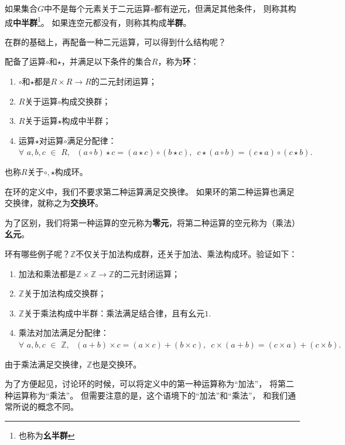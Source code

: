 \documentclass[12pt,UTF8,fontset=none]{ctexbook}
\begin{document}
\begin{appendix}
如果集合$G$中不是每个元素关于二元运算$\circ$都有逆元，但满足其他条件，
则称其构成\textbf{中半群}\footnote{也称为\textbf{幺半群}}。
如果连空元都没有，则称其构成\textbf{半群}。

在群的基础上，再配备一种二元运算，可以得到什么结构呢？

\begin{df}\label{df:0_2}
    配备了运算$\circ$和$\star$，并满足以下条件的集合$R$，称为\textbf{环}：

    \begin{enumerate}
        \item $\circ$和$\star$都是$R \times R \rightarrow R$的二元封闭运算；
        \item $R$关于运算$\circ$构成交换群；
        \item $R$关于运算$\star$构成中半群；
        \item 运算$\star$对运算$\circ$满足分配律：$\forall \,\, a, b, c \,\, \in \,\, R, \,\,\,\, (a \circ b) \star c = (a \star c) \circ (b \star c), \,\,\, c\star (a \circ b) = (c \star a) \circ (c \star b).$
    \end{enumerate}
    也称$R$关于$\circ, \star$构成环。
\end{df}

在环的定义中，我们不要求第二种运算满足交换律。
如果环的第二种运算也满足交换律，就称之为\textbf{交换环}。

为了区别，我们将第一种运算的空元称为\textbf{零元}，将第二种运算的空元称为（乘法）\textbf{幺元}。

环有哪些例子呢？$\mathbb{Z}$不仅关于加法构成群，还关于加法、乘法构成环。验证如下：

\begin{enumerate}
    \item 加法和乘法都是$\mathbb{Z} \times \mathbb{Z} \rightarrow \mathbb{Z}$的二元封闭运算；
    \item $\mathbb{Z}$关于加法构成交换群；
    \item $\mathbb{Z}$关于乘法构成中半群：乘法满足结合律，且有幺元$1$.
    \item 乘法对加法满足分配律：$\forall \,\, a, b, c \,\, \in \,\, \mathbb{Z}, \,\,\,\, (a + b) \times c = (a \times c) + (b \times c), \,\,\, c \times (a + b) = (c \times a) + (c \times b).$
\end{enumerate}

由于乘法满足交换律，$\mathbb{Z}$也是交换环。

为了方便起见，讨论环的时候，可以将定义中的第一种运算称为“加法”，
将第二种运算称为“乘法”。
但需要注意的是，这个语境下的“加法”和“乘法”，
和我们通常所说的概念不同。


\end{appendix}
\end{document}
